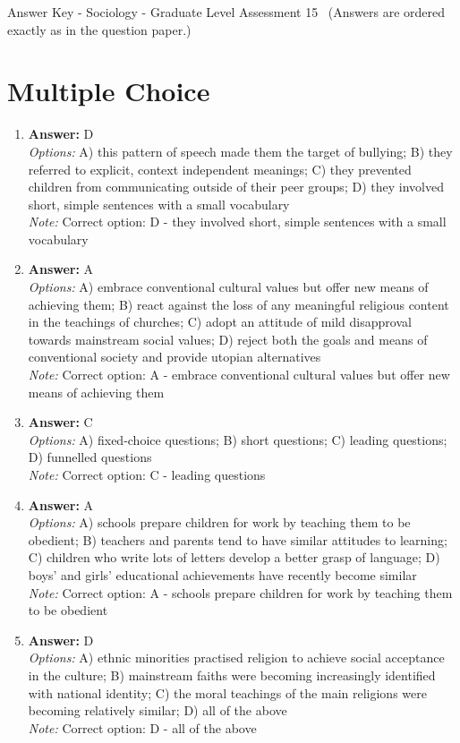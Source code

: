 \documentclass[12pt]{article}
\begin{document}
\begin{center}
Answer Key - Sociology - Graduate Level Assessment 15 \
\small (Answers are ordered exactly as in the question paper.)
\end{center}

\section*{Multiple Choice}
\begin{enumerate}[label=\arabic*.]
\item \textbf{Answer:} D
\\ \textit{Options:} A) this pattern of speech made them the target of bullying; B) they referred to explicit, context independent meanings; C) they prevented children from communicating outside of their peer groups; D) they involved short, simple sentences with a small vocabulary
\\ \textit{Note:} Correct option: D - they involved short, simple sentences with a small vocabulary
\item \textbf{Answer:} A
\\ \textit{Options:} A) embrace conventional cultural values but offer new means of achieving them; B) react against the loss of any meaningful religious content in the teachings of churches; C) adopt an attitude of mild disapproval towards mainstream social values; D) reject both the goals and means of conventional society and provide utopian alternatives
\\ \textit{Note:} Correct option: A - embrace conventional cultural values but offer new means of achieving them
\item \textbf{Answer:} C
\\ \textit{Options:} A) fixed-choice questions; B) short questions; C) leading questions; D) funnelled questions
\\ \textit{Note:} Correct option: C - leading questions
\item \textbf{Answer:} A
\\ \textit{Options:} A) schools prepare children for work by teaching them to be obedient; B) teachers and parents tend to have similar attitudes to learning; C) children who write lots of letters develop a better grasp of language; D) boys' and girls' educational achievements have recently become similar
\\ \textit{Note:} Correct option: A - schools prepare children for work by teaching them to be obedient
\item \textbf{Answer:} D
\\ \textit{Options:} A) ethnic minorities practised religion to achieve social acceptance in the culture; B) mainstream faiths were becoming increasingly identified with national identity; C) the moral teachings of the main religions were becoming relatively similar; D) all of the above
\\ \textit{Note:} Correct option: D - all of the above
\end{enumerate}
\end{document}
